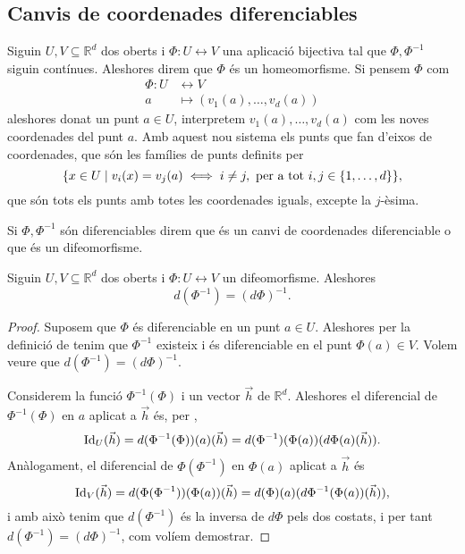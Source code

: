 \documentclass[../Apunts.tex]{subfiles}
\begin{document}
	\subsection{Canvis de coordenades diferenciables}
	\begin{definition}
		\label{def:homeomorfisme}
		\label{def:difeomorfisme}
		Siguin \(U,V\subseteq\mathbb{R}^{d}\) dos oberts i \(\Phi\colon U\longleftrightarrow V\) una aplicació bijectiva tal que \(\Phi,\Phi^{-1}\) siguin contínues. Aleshores direm que \(\Phi\) és un homeomorfisme. Si pensem \(\Phi\) com
		\begin{align*}
		\Phi\colon U&\longleftrightarrow V\\
		a&\longmapsto(v_{1}(a),\dots,v_{d}(a))
		\end{align*}
		aleshores donat un punt \(a\in U\), interpretem \(v_{1}(a),\dots,v_{d}(a)\) com les noves coordenades del punt \(a\). Amb aquest nou sistema els punts que fan d'eixos de coordenades, que són les famílies de punts definits per
		\[\{x\in U\mid v_{i}(x)=v_{j}(a)\iff i\neq j,\text{ per a tot }i,j\in\{1,\dots,d\}\},\]
		que són tots els punts amb totes les coordenades iguals, excepte la \(j\)-èsima.
		
		Si \(\Phi,\Phi^{-1}\) són diferenciables direm que és un canvi de coordenades diferenciable o que és un difeomorfisme.
	\end{definition}
	\begin{proposition}\label{prop:difeomorfisme diferenciable invertible}
		Siguin \(U,V\subseteq\mathbb{R}^{d}\) dos oberts i \(\Phi\colon U\longleftrightarrow V\) un difeomorfisme. Aleshores
		\[d(\Phi^{-1})=(d\Phi)^{-1}.\]
		\begin{proof}
			Suposem que \(\Phi\) és diferenciable en un punt \(a\in U\). Aleshores per la definició de  tenim que \(\Phi^{-1}\) existeix i és diferenciable en el punt \(\Phi(a)\in V\). Volem veure que \(d(\Phi^{-1})=(d\Phi)^{-1}\).
			
			Considerem la funció \(\Phi^{-1}(\Phi)\) i un vector \(\vec{h}\) de \(\mathbb{R}^{d}\). Aleshores el diferencial de \(\Phi^{-1}(\Phi)\) en \(a\) aplicat a \(\vec{h}\) és, per ,
			\[\operatorname{Id}_{U}(\vec{h})=d(\Phi^{-1}(\Phi))(a)(\vec{h})=d(\Phi^{-1})(\Phi(a))(d\Phi(a)(\vec{h})).\]
			Anàlogament, el diferencial de \(\Phi(\Phi^{-1})\) en \(\Phi(a)\) aplicat a \(\vec{h}\) és
			\[\operatorname{Id}_{V}(\vec{h})=d(\Phi(\Phi^{-1}))(\Phi(a))(\vec{h})=d(\Phi)(a)(d\Phi^{-1}(\Phi(a))(\vec{h})),\]
			i amb això tenim que \(d(\Phi^{-1})\) és la inversa de \(d\Phi\) pels dos costats, i per tant \(d(\Phi^{-1})=(d\Phi)^{-1}\), com volíem demostrar.
		\end{proof} %
	\end{proposition}
\end{document}
